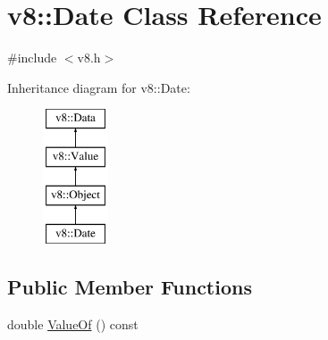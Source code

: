 \hypertarget{classv8_1_1Date}{}\section{v8\+:\+:Date Class Reference}
\label{classv8_1_1Date}


{\ttfamily \#include $<$v8.\+h$>$}

Inheritance diagram for v8\+:\+:Date\+:\begin{figure}[H]
\begin{center}
\leavevmode
\includegraphics[height=4.000000cm]{classv8_1_1Date}
\end{center}
\end{figure}
\subsection*{Public Member Functions}
\begin{DoxyCompactItemize}
\item 
double \mbox{\hyperlink{classv8_1_1Date_adb9d292549a173e045ee177051dbde19}{Value\+Of}} () const
\end{DoxyCompactItemize}
